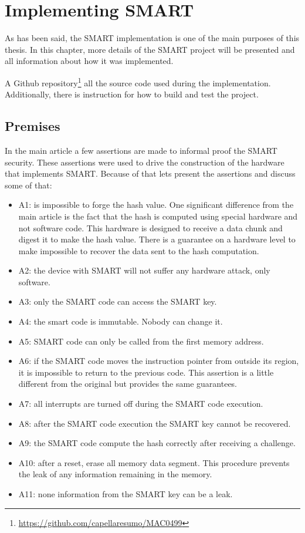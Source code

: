 \chapter{Implementing SMART}

As has been said, the SMART implementation is one of the main purposes of this thesis. In this chapter, more details of the SMART project will be presented and all information about how it was implemented. 

A Github repository\footnote{\url{https://github.com/capellaresumo/MAC0499}} all the source code used during the implementation. Additionally, there is instruction for how to build and test the project. 

\section{Premises}

In the main article a few assertions are made to informal proof the SMART security. These assertions were used to drive the construction of the hardware that implements SMART. Because of that lets present the assertions and discuss some of that:

\begin{itemize}
	\item A1: is impossible to forge the hash value. One significant difference from the main article is the fact that the hash is computed using special hardware and not software code. This hardware is designed to receive a data chunk and digest it to make the hash value. There is a guarantee on a hardware level to make impossible to recover the data sent to the hash computation.
	\item A2: the device with SMART will not suffer any hardware attack, only software.
	\item A3: only the SMART code can access the SMART key. 
	\item A4: the smart code is immutable. Nobody can change it. %
	\item A5: SMART code can only be called from the first memory address. 
	\item A6: if the SMART code moves the instruction pointer from outside its region, it is impossible to return to the previous code. This assertion is a little different from the original but provides the same guarantees. 
	\item A7: all interrupts are turned off during the SMART code execution.
	\item A8: after the SMART code execution the SMART key cannot be recovered.
	\item A9: the SMART code compute the hash correctly after receiving a challenge. 
	\item A10: after a reset, erase all memory data segment. This procedure prevents the leak of any information remaining in the memory.
	\item A11: none information from the SMART key can be a leak.
\end{itemize}


